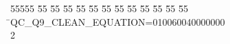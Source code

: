 %
%
\begin{tabbing}
55555 \= 55 \= 55 \= 55 \= 55 \= 55 \= 55 \= 55 \= 55 \= 55 \= 55 \= 55 \= 55 \= \>QC\_Q9\_CLEAN\_EQUATION=010060040000000\\[0pt]
2\>\end{tabbing}
